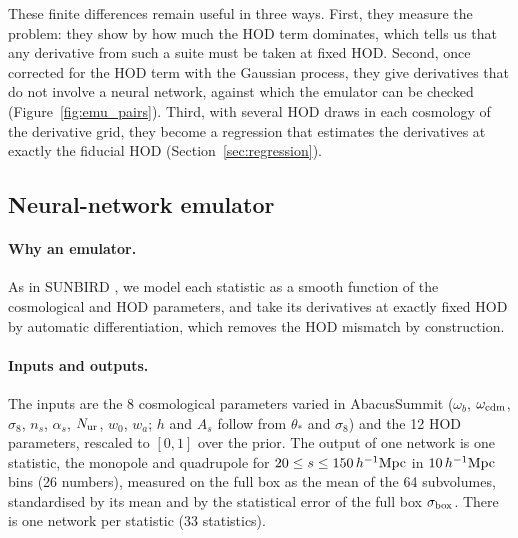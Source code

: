 These finite differences remain useful in three ways. First, they measure the problem: they show by how much the HOD term dominates, which tells us that any derivative from such a suite must be taken at fixed HOD. Second, once corrected for the HOD term with the Gaussian process, they give derivatives that do not involve a neural network, against which the emulator can be checked (Figure~\ref{fig:emu_pairs}). Third, with several HOD draws in each cosmology of the derivative grid, they become a regression that estimates the derivatives at exactly the fiducial HOD (Section~\ref{sec:regression}).

\subsection{Neural-network emulator}
\label{sec:emulator}

\paragraph{Why an emulator.} As in SUNBIRD \cite{CuestaLazaro2024}, we model each statistic as a smooth function of the cosmological and HOD parameters, and take its derivatives at exactly fixed HOD by automatic differentiation, which removes the HOD mismatch by construction.

\paragraph{Inputs and outputs.} The inputs are the 8 cosmological parameters varied in AbacusSummit ($\omega_b$, $\omega_{\rm cdm}$, $\sigma_8$, $n_s$, $\alpha_s$, $N_{\rm ur}$, $w_0$, $w_a$; $h$ and $A_s$ follow from $\theta_*$ and $\sigma_8$) and the 12 HOD parameters, rescaled to $[0,1]$ over the prior. The output of one network is one statistic, the monopole and quadrupole for $20\le s\le150\,h^{-1}\mathrm{Mpc}$ in $10\,h^{-1}\mathrm{Mpc}$ bins (26 numbers), measured on the full box as the mean of the 64 subvolumes, standardised by its mean and by the statistical error of the full box $\sigma_{\rm box}$. There is one network per statistic (33 statistics).

